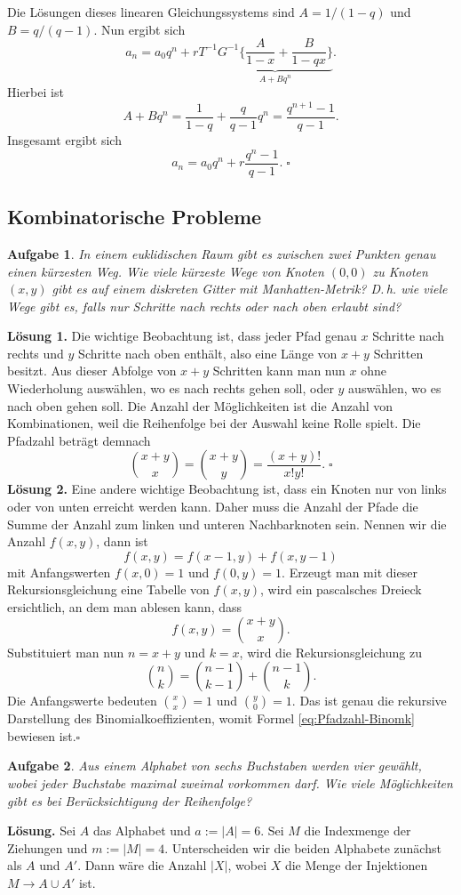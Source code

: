 \documentclass[a4paper,10pt,fleqn,twoside]{scrartcl}
\numberwithin{equation}{section}
\newcommand{\strong}[1]{{\normalfont\sffamily\bfseries #1}}
\renewcommand{\qedsymbol}{\ensuremath{\square}}
\theoremstyle{Aufgabe}
\newtheorem{Aufgabe}{\sffamily Aufgabe}[section]
\begin{document}
Die Lösungen dieses linearen Gleichungssystems
sind $A=1/(1-q)$ und $B=q/(q-1)$. Nun ergibt sich
\[ a_n = a_0q^n + rT^{-1} \underbrace{G^{-1}\bigg\{\frac{A}{1-x} + \frac{B}{1-qx}\bigg\}}_{A+Bq^n}.\]
Hierbei ist
\[ A+Bq^n = \frac{1}{1-q}+\frac{q}{q-1}q^n = \frac{q^{n+1}-1}{q-1}.\]
Insgesamt ergibt sich
\[ a_n = a_0q^n + r\frac{q^n-1}{q-1}.\;\qedsymbol\]

\newpage
\subsection{Kombinatorische Probleme}
\begin{Aufgabe}
In einem euklidischen Raum gibt es zwischen zwei Punkten genau einen
kürzesten Weg. Wie viele kürzeste Wege von Knoten $(0,0)$ zu Knoten
$(x,y)$ gibt es auf einem diskreten Gitter mit Manhatten-Metrik? D.\,h.
wie viele Wege gibt es, falls nur Schritte nach rechts oder nach
oben erlaubt sind?
\end{Aufgabe}
\strong{Lösung 1.} Die wichtige Beobachtung ist, dass jeder Pfad genau
$x$ Schritte nach rechts und $y$ Schritte nach oben enthält, also
eine Länge von $x+y$ Schritten besitzt. Aus dieser Abfolge von
$x+y$ Schritten kann man nun $x$ ohne Wiederholung auswählen, wo es
nach rechts gehen soll, oder $y$ auswählen, wo es nach oben gehen soll.
Die Anzahl der Möglichkeiten ist die Anzahl von Kombinationen,
weil die Reihenfolge bei der Auswahl keine Rolle spielt. Die
Pfadzahl beträgt demnach
\[\binom{x+y}{x} = \binom{x+y}{y} = \frac{(x+y)!}{x!y!}.\;\qedsymbol\]
\strong{Lösung 2.} Eine andere wichtige Beobachtung ist, dass ein
Knoten nur von links oder von unten erreicht werden kann. Daher muss
die Anzahl der Pfade die Summe der Anzahl zum linken und unteren
Nachbarknoten sein. Nennen wir die Anzahl $f(x,y)$, dann ist
\[f(x,y) = f(x-1,y) + f(x,y-1)\]
mit Anfangswerten $f(x,0)=1$ und $f(0,y)=1$. Erzeugt man mit
dieser Rekursionsgleichung eine Tabelle von $f(x,y)$, wird ein
pascalsches Dreieck ersichtlich, an dem man ablesen kann, dass
\begin{equation}\label{eq:Pfadzahl-Binomk}
f(x,y) = \binom{x+y}{x}.
\end{equation}
Substituiert man nun $n=x+y$ und $k=x$, wird
die Rekursionsgleichung zu
\[\binom{n}{k} = \binom{n-1}{k-1} + \binom{n-1}{k}.\]
Die Anfangswerte bedeuten $\binom{x}{x} = 1$ und $\binom{y}{0} = 1$.
Das ist genau die rekursive Darstellung des Binomialkoeffizienten,
womit Formel \eqref{eq:Pfadzahl-Binomk} bewiesen ist.\;\qedsymbol

\begin{Aufgabe}
Aus einem Alphabet von sechs Buchstaben werden vier gewählt, wobei
jeder Buchstabe maximal zweimal vorkommen darf. Wie viele Möglichkeiten
gibt es bei Berücksichtigung der Reihenfolge?
\end{Aufgabe}
\strong{Lösung.} Sei $A$ das Alphabet und $a:=|A|=6$. Sei
$M$ die Indexmenge der Ziehungen und $m:=|M|=4$. Unterscheiden
wir die beiden Alphabete zunächst als $A$ und $A'$. Dann wäre die
Anzahl $|X|$, wobei $X$ die Menge der Injektionen $M\to A\cup A'$
ist.
\end{document}
